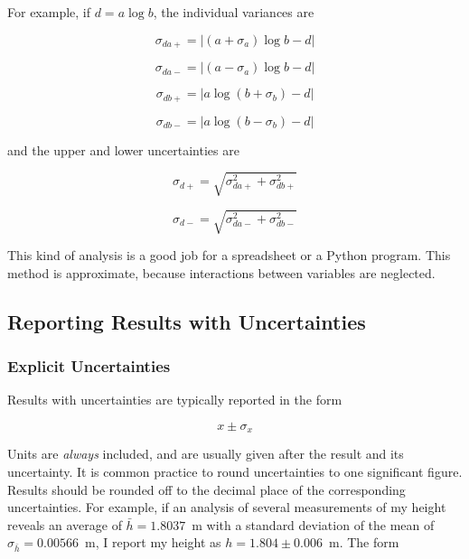 \documentclass[12pt]{article}
\begin{document}
For example, if $d = a \log b$, the individual variances are 

\begin{equation}
\sigma_{da+} = |(a+\sigma_a) \log b - d|
\end{equation}
  
\begin{equation}
\sigma_{da-} = |(a-\sigma_a) \log b - d|
\end{equation}

\begin{equation}
\sigma_{db+} = |a \log (b+\sigma_b) - d|
\end{equation}

\begin{equation}
\sigma_{db-} = |a \log (b-\sigma_b) - d|
\end{equation}

\noindent
and the upper and lower uncertainties are

\begin{equation}
\sigma_{d+} = \sqrt{\sigma_{da+}^2 + \sigma_{db+}^2}
\end{equation}

\begin{equation}
\sigma_{d-} = \sqrt{\sigma_{da-}^2 + \sigma_{db-}^2}
\end{equation}

This kind of analysis is a good job for a spreadsheet or a Python 
program. This method is approximate, because interactions between 
variables are neglected.

\subsection*{Reporting Results with Uncertainties}

\subsubsection*{Explicit Uncertainties}

Results with uncertainties are typically reported in the form

\begin{equation}
x \pm \sigma_x 
\end{equation}

Units are \textit{always} included, and are usually given after the
result and its uncertainty. It is common practice to round
uncertainties to one significant figure. Results should be rounded off
to the decimal place of the corresponding uncertainties. For example,
if an analysis of several measurements of my height reveals an average
of $\bar{h} = 1.8037$~m with a standard deviation of the mean of
$\sigma_{\bar{h}} = 0.00566$~m, I report my height as $h = 1.804 \pm
0.006$~m. The form
\end{document}
